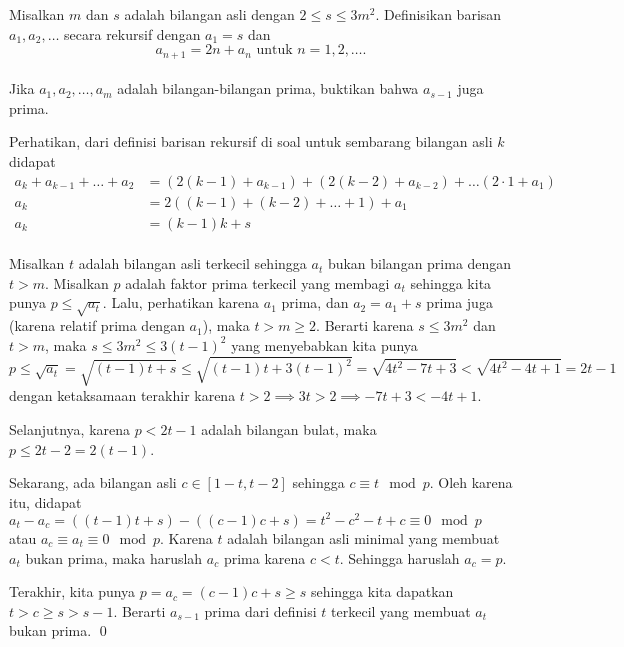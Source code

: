 \documentclass[11pt]{scrartcl}
\begin{document}
	\begin{soalbaru}
		Misalkan $m$ dan $s$ adalah bilangan asli dengan $2 \le s \le 3m^2.$ Definisikan barisan $a_1,a_2,\dots$ secara rekursif dengan $a_1=s$ dan \\[-18pt]$$a_{n+1} = 2n + a_n \text{    untuk   }  n=1,2,\dots.$$\\[-23pt]
		Jika $a_1,a_2,\dots,a_m$ adalah bilangan-bilangan prima, buktikan bahwa $a_{s-1}$ juga prima.\\[-10pt]
		\begin{solusi}
			Perhatikan, dari definisi barisan rekursif di soal untuk sembarang bilangan asli $k$ didapat\\[-23pt]
			\begin{align*}
				a_{k}+a_{k-1}+\dots+a_2 &= (2(k-1)+a_{k-1})+(2(k-2)+a_{k-2})+\dots (2\cdot 1+a_1)\\
				a_k &= 2((k-1)+(k-2)+\dots+1)+a_1\\
				a_k &= (k-1)k + s
			\end{align*}\\[-25pt] 
			Misalkan $t$ adalah bilangan asli terkecil sehingga $a_t$ bukan bilangan prima dengan $t > m$. Misalkan $p$ adalah faktor prima terkecil yang membagi $a_t$ sehingga kita punya $p \le \sqrt{a_t}$. Lalu, perhatikan karena $a_1 $ prima, dan $a_2 = a_1 +s$ prima juga (karena relatif prima dengan $a_1$), maka $t>m \ge 2$. Berarti karena $s \le 3m^2$ dan $t > m$, maka $ s \le 3m^2 \le 3(t-1)^2$ yang menyebabkan kita punya 
			$$p \le \sqrt{a_t} = \sqrt{(t-1)t+s}\le \sqrt{(t-1)t+3(t-1)^2} = \sqrt{4t^2-7t+3} < \sqrt{4t^2-4t+1} = 2t-1$$dengan ketaksamaan terakhir karena $t > 2 \implies 3t > 2 \implies -7t+3 < -4t+1$.
			
			Selanjutnya, karena $p<2t-1$ adalah bilangan bulat, maka $p \le 2t-2 = 2(t-1)$. 
			
			Sekarang, ada bilangan asli $c \in [1-t,t-2]$ sehingga $c \equiv t \mod p$. Oleh karena itu, didapat $a_t - a_c = ((t-1)t+s)-((c-1)c+s) = t^2 - c^2 - t+c \equiv 0 \mod p$ atau $a_c \equiv a_t \equiv 0 \mod p$. Karena $t$ adalah bilangan asli minimal yang membuat $a_t$ bukan prima, maka haruslah $a_c$ prima karena $c<t$. Sehingga haruslah $a_c = p$.
			
			Terakhir, kita punya $p=a_c=(c-1)c+s \ge s$ sehingga kita dapatkan $t > c \ge s > s-1$. Berarti $a_{s-1}$ prima dari definisi $t$ terkecil yang membuat $a_t$ bukan prima. \qed
		\end{solusi}
		
	\end{soalbaru}
\end{document}
